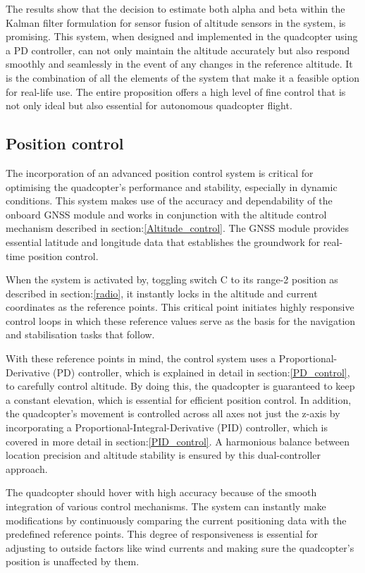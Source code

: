 \documentclass{article}
\begin{document}
The results show that the decision to estimate both alpha and beta within the
Kalman filter formulation for sensor fusion of altitude sensors in the system,
is promising. This system, when designed and implemented in the quadcopter using
a PD controller, can not only maintain the altitude accurately but also respond
smoothly and seamlessly in the event of any changes in the reference altitude.
It is the combination of all the elements of the system that make it a feasible
option for real-life use. The entire proposition offers a high level of fine
control that is not only ideal but also essential for autonomous quadcopter
flight.

\subsection{Position control}
The incorporation of an advanced position control system is critical for
optimising the quadcopter's performance and stability, especially in dynamic
conditions. This system makes use of the accuracy and dependability of the
onboard GNSS module and works in conjunction with the altitude control mechanism
described in section:\ref{Altitude_control}. The GNSS module provides essential
latitude and longitude data that establishes the groundwork for real-time
position control.

When the system is activated by, toggling switch C to its range-2 position as
described in section:\ref{radio}, it instantly locks in the altitude and current
coordinates as the reference points. This critical point initiates highly
responsive control loops in which these reference values serve as the basis for
the navigation and stabilisation tasks that follow.

With these reference points in mind, the control system uses a
Proportional-Derivative (PD) controller, which is explained in detail in
section:\ref{PD_control}, to carefully control altitude. By doing this, the
quadcopter is guaranteed to keep a constant elevation, which is essential for
efficient position control. In addition, the quadcopter's movement is controlled
across all axes not just the z-axis by incorporating a
Proportional-Integral-Derivative (PID) controller, which is covered in more
detail in section:\ref{PID_control}. A harmonious balance between location
precision and altitude stability is ensured by this dual-controller approach. 

The quadcopter should hover with high accuracy because of the smooth integration
of various control mechanisms. The system can instantly make modifications by
continuously comparing the current positioning data with the predefined
reference points. This degree of responsiveness is essential for adjusting to
outside factors like wind currents and making sure the quadcopter's position is
unaffected by them.
\end{document}

